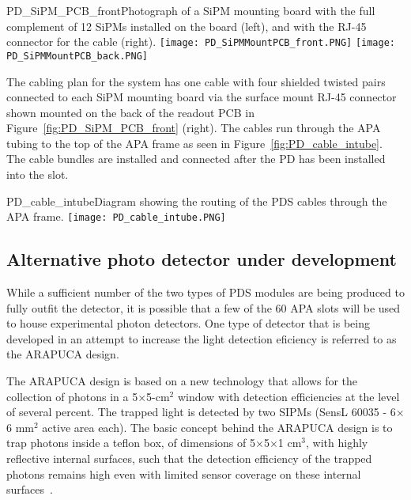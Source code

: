 \begin{cdrfigure}
  {PD_SiPM_PCB_front}{Photograph of a SiPM mounting board
    with the full complement of 12 SiPMs installed on the board (left), and with the 
    RJ-45 connector for the cable (right).}
\texttt{[image: PD\_SiPMMountPCB\_front.PNG]}
\texttt{[image: PD\_SiPMMountPCB\_back.PNG]}
\end{cdrfigure}


The cabling plan for the system has one cable with four shielded twisted pairs 
connected to each SiPM mounting board via the surface mount RJ-45 connector
shown mounted on the back of the readout PCB in 
Figure~\ref{fig:PD_SiPM_PCB_front} (right).  
The cables run through the APA tubing to the top of the APA frame as seen
in Figure~\ref{fig:PD_cable_intube}.
The cable bundles are installed and connected 
after the PD has been installed into the slot.
\begin{cdrfigure}
  {PD_cable_intube}{Diagram showing the routing of the PDS cables
    through the APA frame.}
\texttt{[image: PD\_cable\_intube.PNG]}
\end{cdrfigure}


\subsection{Alternative photo detector under development}

While a sufficient number of the two types of PDS modules are being produced to fully outfit the detector, it is possible that a few of the 60 APA slots will be used to house experimental photon detectors. One type of detector that is being developed in an attempt to increase the light detection eficiency is referred to as the ARAPUCA design.

The ARAPUCA design is based on a new technology that allows for the collection of photons in a 5$\times$5-cm$^2$ window  with detection efficiencies at the level of several percent. The trapped light is detected by two SIPMs (SensL 60035 - 6$\times$6 mm$^2$ active area each). The basic concept behind the ARAPUCA design is to trap photons inside a teflon box, of  dimensions of 5$\times$5$\times$1 cm$^3$, with highly reflective internal surfaces, such that the detection efficiency of the trapped photons remains high even with limited sensor coverage on these internal surfaces~\cite{Machado:2016jqe}.

